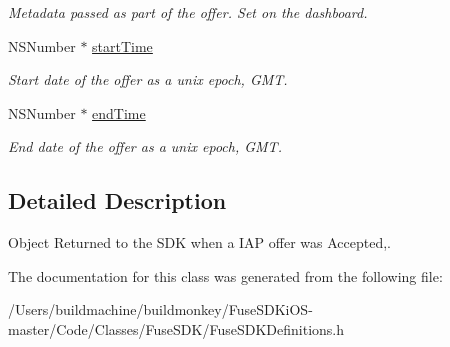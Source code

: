 \begin{DoxyCompactItemize}
\begin{DoxyCompactList}\small\item\em Metadata passed as part of the offer. Set on the dashboard. \end{DoxyCompactList}\item 
\hypertarget{interface_fuse_i_a_p_offer_object_a498e28eb1d66c5f180a7c5b1821fa7de}{}N\+S\+Number $\ast$ \hyperlink{interface_fuse_i_a_p_offer_object_a498e28eb1d66c5f180a7c5b1821fa7de}{start\+Time}\label{interface_fuse_i_a_p_offer_object_a498e28eb1d66c5f180a7c5b1821fa7de}

\begin{DoxyCompactList}\small\item\em Start date of the offer as a unix epoch, G\+M\+T. \end{DoxyCompactList}\item 
\hypertarget{interface_fuse_i_a_p_offer_object_a25d920dd9d75005ff4a80ea4cf1b8d53}{}N\+S\+Number $\ast$ \hyperlink{interface_fuse_i_a_p_offer_object_a25d920dd9d75005ff4a80ea4cf1b8d53}{end\+Time}\label{interface_fuse_i_a_p_offer_object_a25d920dd9d75005ff4a80ea4cf1b8d53}

\begin{DoxyCompactList}\small\item\em End date of the offer as a unix epoch, G\+M\+T. \end{DoxyCompactList}\end{DoxyCompactItemize}


\subsection{Detailed Description}
Object Returned to the S\+D\+K when a I\+A\+P offer was Accepted,. 

The documentation for this class was generated from the following file\+:\begin{DoxyCompactItemize}
\item 
/\+Users/buildmachine/buildmonkey/\+Fuse\+S\+D\+Ki\+O\+S-\/master/\+Code/\+Classes/\+Fuse\+S\+D\+K/Fuse\+S\+D\+K\+Definitions.\+h\end{DoxyCompactItemize}

